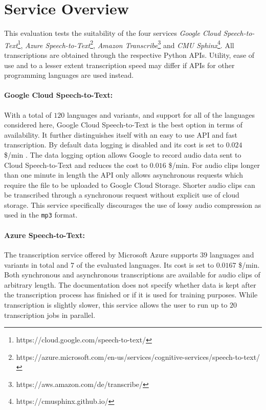 \documentclass[11pt]{article}
\begin{document}
\section{Service Overview}

This evaluation tests the suitability of the four services \emph{Google Cloud Speech-to-Text}\footnote{https://cloud.google.com/speech-to-text/}, \emph{Azure Speech-to-Text}\footnote{https://azure.microsoft.com/en-us/services/cognitive-services/speech-to-text/}, \emph{Amazon Transcribe}\footnote{https://aws.amazon.com/de/transcribe/} and \emph{CMU Sphinx}\footnote{https://cmusphinx.github.io/}.
All transcriptions are obtained through the respective Python APIs.
Utility, ease of use and to a lesser extent transcription speed may differ if APIs for other programming languages are used instead.

\paragraph{Google Cloud Speech-to-Text:}
With a total of $120$ languages and variants, and support for all of the languages considered here, Google Cloud Speech-to-Text is the best option in terms of availability. 
It further distinguishes itself with an easy to use API and fast transcription.
By default data logging is disabled and its cost is set to $0.024$ \$/min .
The data logging option allows Google to record audio data sent to Cloud Speech-to-Text and reduces the cost to $0.016$ \$/min.
For audio clips longer than one minute in length the API only allows asynchronous requests which require the file to be uploaded to Google Cloud Storage.
Shorter audio clips can be transcribed through a synchronous request without explicit use of cloud storage.
This service specifically discourages the use of lossy audio compression as used in the \texttt{mp3} format.

\paragraph{Azure Speech-to-Text:}
The transcription service offered by Microsoft Azure supports $39$ languages and variants in total and $7$ of the evaluated languages. 
Its cost is set to $0.0167$ \$/min.
Both synchronous and asynchronous transcriptions are available for audio clips of arbitrary length.
The documentation does not specify whether data is kept after the transcription process has finished or if it is used for training purposes.
While transcription is slightly slower, this service allows the user to run up to $20$ transcription jobs in parallel.
\end{document}
